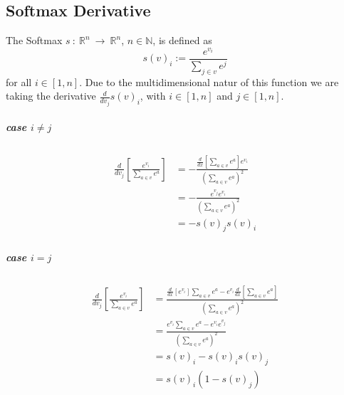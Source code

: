 \documentclass[12pt]{article}
\begin{document}
\subsection{Softmax Derivative}
The Softmax \(s~:~\mathbb R^n~\to~\mathbb R^n\), \(n\in\mathbb N\), is defined as
\begin{equation} \label{eq:proof:softmax}
s(v)_i := \frac{e^{v_i}}{\sum_{j \in v} e^j}
\end{equation}
for all \(i \in [1,n]\). Due to the multidimensional natur of this function we are taking the derivative \(\frac{d}{dv_j}s(v)_i\), with \(i \in [1,n]\) and \(j \in [1,n]\). 
\subparagraph*{case \(i \neq j\)}
\begin{align}
\begin{split}
\frac{d}{dv_j}\left[\frac{e^{v_i}}{\sum_{a \in v} e^a}\right] &= -\frac{\frac{d}{dx}\left[\sum_{a \in v} e^a\right]e^{v_i}}{(\sum_{a \in v} e^a)^2}\\
&= -\frac{e^{v_j} e^{v_i}}{(\sum_{a \in v} e^a)^2}\\
&= -s(v)_j s(v)_i
\end{split}
\end{align}
\subparagraph*{case \(i = j\)}
\begin{align}
\begin{split}
\frac{d}{dv_j}\left[\frac{e^{v_i}}{\sum_{a \in v} e^a}\right] 
&= \frac{\frac{d}{dx}\left[e^{v_i}\right]\sum_{a \in v} e^a - e^{v_i}\frac{d}{dx}\left[\sum_{a \in v} e^a\right]}{(\sum_{a \in v} e^a)^2}\\
&= \frac{e^{v_i}\sum_{a \in v} e^a - e^{v_i}e^{v_j}}{(\sum_{a \in v} e^a)^2}\\
&= s(v)_i - s(v)_i s(v)_j\\
&= s(v)_i (1 - s(v)_j)
\end{split}
\end{align}
\end{document}
